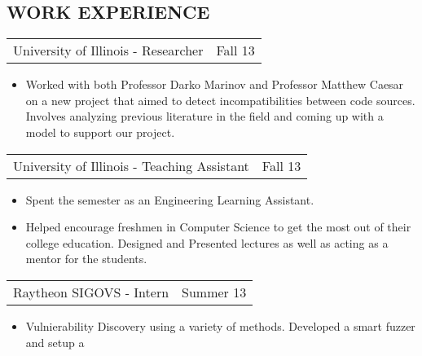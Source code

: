 \documentclass[margin]{res}
\begin{document}
\begin{resume}
\section{WORK EXPERIENCE}
\begin{tabular}{p{3in} r} %
                  University of Illinois - Researcher &  Fall 13
                  \end{tabular}
                   \begin{itemize} \itemsep -2pt %
                     \item Worked with both Professor Darko Marinov
                       and Professor Matthew Caesar on a new project
                       that aimed to detect incompatibilities between
                       code sources.  Involves analyzing previous
                       literature in the field and coming up with a
                       model to support our project.
		   \end{itemize}
\begin{tabular}{p{3in} r} %
                  University of Illinois - Teaching Assistant&  Fall 13
                  \end{tabular}
                   \begin{itemize} \itemsep -2pt %
                     \item Spent the semester as an Engineering Learning Assistant.
                     \item Helped encourage freshmen in Computer
                       Science to get the most out of their college
                       education.  Designed and Presented lectures as
                       well as acting as a mentor for the students.
		   \end{itemize}
\begin{tabular}{p{3in} r} %
                  Raytheon SIGOVS - Intern &  Summer 13
                  \end{tabular}
                   \begin{itemize} \itemsep -2pt %
                    \item Vulnierability Discovery using a variety of
                      methods.  Developed a smart fuzzer and setup a

\end{itemize}
\end{resume}
\end{document}

